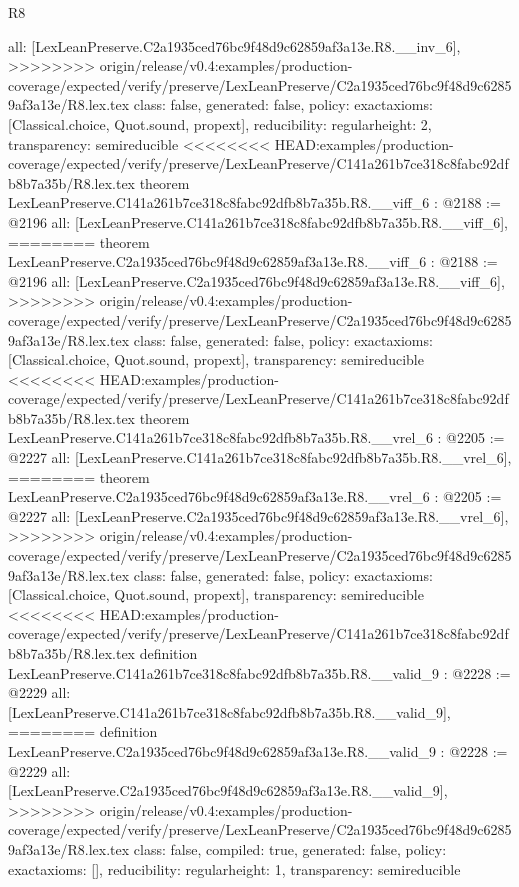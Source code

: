 \begin{lexlean}{R8}
\begin{coremodule}
{{{{{{{{{{{{  all: [LexLeanPreserve.C2a1935ced76bc9f48d9c62859af3a13e.R8.__inv_6],
>>>>>>>> origin/release/v0.4:examples/production-coverage/expected/verify/preserve/LexLeanPreserve/C2a1935ced76bc9f48d9c62859af3a13e/R8.lex.tex
  class: false,
  generated: false,
  policy: exact{axioms: [Classical.choice, Quot.sound, propext]},
  reducibility: regular{height: 2},
  transparency: semireducible
}
<<<<<<<< HEAD:examples/production-coverage/expected/verify/preserve/LexLeanPreserve/C141a261b7ce318c8fabc92dfb8b7a35b/R8.lex.tex
theorem LexLeanPreserve.C141a261b7ce318c8fabc92dfb8b7a35b.R8.__viff_6 : @2188 := @2196 {
  all: [LexLeanPreserve.C141a261b7ce318c8fabc92dfb8b7a35b.R8.__viff_6],
========
theorem LexLeanPreserve.C2a1935ced76bc9f48d9c62859af3a13e.R8.__viff_6 : @2188 := @2196 {
  all: [LexLeanPreserve.C2a1935ced76bc9f48d9c62859af3a13e.R8.__viff_6],
>>>>>>>> origin/release/v0.4:examples/production-coverage/expected/verify/preserve/LexLeanPreserve/C2a1935ced76bc9f48d9c62859af3a13e/R8.lex.tex
  class: false,
  generated: false,
  policy: exact{axioms: [Classical.choice, Quot.sound, propext]},
  transparency: semireducible
}
<<<<<<<< HEAD:examples/production-coverage/expected/verify/preserve/LexLeanPreserve/C141a261b7ce318c8fabc92dfb8b7a35b/R8.lex.tex
theorem LexLeanPreserve.C141a261b7ce318c8fabc92dfb8b7a35b.R8.__vrel_6 : @2205 := @2227 {
  all: [LexLeanPreserve.C141a261b7ce318c8fabc92dfb8b7a35b.R8.__vrel_6],
========
theorem LexLeanPreserve.C2a1935ced76bc9f48d9c62859af3a13e.R8.__vrel_6 : @2205 := @2227 {
  all: [LexLeanPreserve.C2a1935ced76bc9f48d9c62859af3a13e.R8.__vrel_6],
>>>>>>>> origin/release/v0.4:examples/production-coverage/expected/verify/preserve/LexLeanPreserve/C2a1935ced76bc9f48d9c62859af3a13e/R8.lex.tex
  class: false,
  generated: false,
  policy: exact{axioms: [Classical.choice, Quot.sound, propext]},
  transparency: semireducible
}
<<<<<<<< HEAD:examples/production-coverage/expected/verify/preserve/LexLeanPreserve/C141a261b7ce318c8fabc92dfb8b7a35b/R8.lex.tex
definition LexLeanPreserve.C141a261b7ce318c8fabc92dfb8b7a35b.R8.__valid_9 : @2228 := @2229 {
  all: [LexLeanPreserve.C141a261b7ce318c8fabc92dfb8b7a35b.R8.__valid_9],
========
definition LexLeanPreserve.C2a1935ced76bc9f48d9c62859af3a13e.R8.__valid_9 : @2228 := @2229 {
  all: [LexLeanPreserve.C2a1935ced76bc9f48d9c62859af3a13e.R8.__valid_9],
>>>>>>>> origin/release/v0.4:examples/production-coverage/expected/verify/preserve/LexLeanPreserve/C2a1935ced76bc9f48d9c62859af3a13e/R8.lex.tex
  class: false,
  compiled: true,
  generated: false,
  policy: exact{axioms: []},
  reducibility: regular{height: 1},
  transparency: semireducible
}}}}}}}}}}}}}}}
\end{coremodule}
\end{lexlean}
